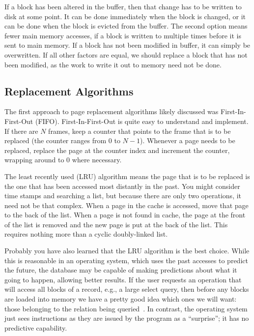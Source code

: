 If a block has been altered in the buffer, then that change has to be written to disk at some point. It can be done immediately when the block is changed, or it can be done when the block is evicted from the buffer. The second option means fewer main memory accesses, if a block is written to multiple times before it is sent to main memory. If a block has not been modified in buffer, it can simply be overwritten. If all other factors are equal, we should replace a block that has not been modified, as the work to write it out to memory need not be done.


\subsection*{Replacement Algorithms}

The first approach to page replacement algorithms likely discussed was First-In-First-Out (FIFO). First-In-First-Out is quite easy to understand and implement. If there are $N$ frames, keep a counter that points to the frame that is to be replaced (the counter ranges from $0$ to $N-1$). Whenever a page needs to be replaced, replace the page at the counter index and increment the counter, wrapping around to 0 where necessary.

The least recently used (LRU) algorithm means the page that is to be replaced is the one that has been accessed most distantly in the past. You might consider time stamps and searching a list, but because there are only two operations, it need not be that complex. When a page in the cache is accessed, move that page to the back of the list. When a page is not found in cache, the page at the front of the list is removed and the new page is put at the back of the list. This requires nothing more than a cyclic doubly-linked list. 

Probably you have also learned that the LRU algorithm is the best choice. While this is reasonable in an operating system, which uses the past accesses to predict the future, the database may be capable of making predictions about what it going to happen, allowing better results. If the user requests an operation that will access all blocks of a record, e.g., a large select query, then before any blocks are loaded into memory we have a pretty good idea which ones we will want: those belonging to the relation being queried~\cite{dsc}. In contrast, the operating system just sees instructions as they are issued by the program as a ``surprise''; it has no predictive capability.

